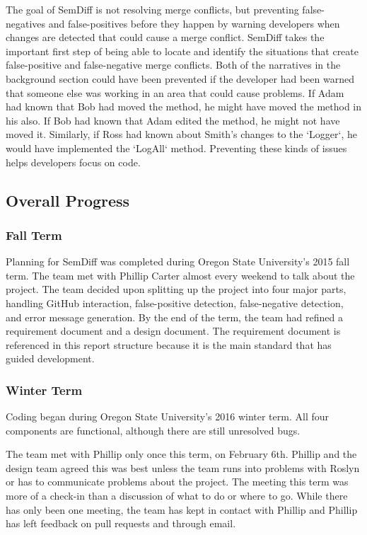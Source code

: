 \documentclass[draftclsnofoot,onecolumn]{IEEEtran}
\begin{document}
The goal of SemDiff is not resolving merge conflicts, but preventing 
false-negatives and false-positives before they happen by warning developers 
when changes are detected that could cause a merge conflict. SemDiff takes 
the important first step of being able to locate and identify the situations 
that create false-positive and false-negative merge conflicts. Both of the 
narratives in the background section could have been prevented if the 
developer had been warned that someone else was working in an area that 
could cause problems. If Adam had known that Bob had moved the method, he 
might have moved the method in his also. If Bob had known that Adam edited 
the method, he might not have moved it. Similarly, if Ross had known about 
Smith’s changes to the `Logger`, he would have implemented the `LogAll` 
method. Preventing these kinds of issues helps developers focus on code.





\subsection{Overall Progress}

\subsubsection{Fall Term}

Planning for SemDiff was completed during Oregon State University’s 2015 
fall term. The team met with Phillip Carter almost every weekend to talk 
about the project. The team decided upon splitting up the project into four 
major parts, handling GitHub interaction, false-positive detection, 
false-negative detection, and error message generation. By the end of the 
term, the team had refined a requirement document and a design document. The 
requirement document is referenced in this report structure because it is 
the main standard that has guided development.

\subsubsection{Winter Term}

Coding began during Oregon State University’s 2016 winter term. All four 
components are functional, although there are still unresolved bugs. 

The team met with Phillip only once this term, on February 6th. Phillip and 
the design team agreed this was best unless the team runs into problems with 
Roslyn or has to communicate problems about the project. The meeting this 
term was more of a check-in than a discussion of what to do or where to go. 
While there has only been one meeting, the team has kept in contact with 
Phillip and Phillip has left feedback on pull requests and through email.
\end{document}

